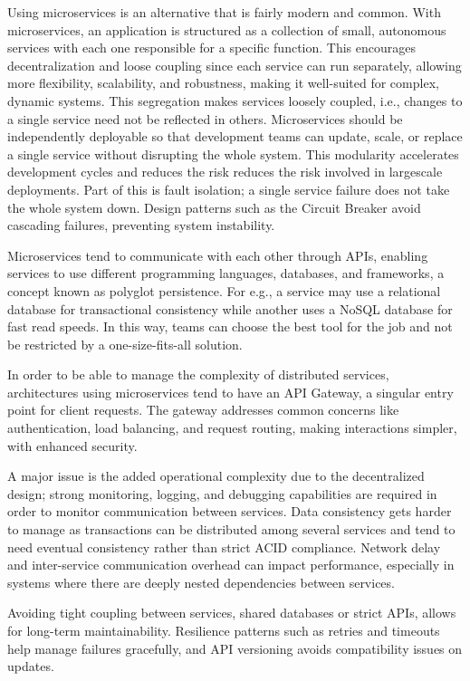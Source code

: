 \documentclass[]{final}
\begin{document}
Using microservices is an alternative that is fairly modern and common.
With microservices, an application is structured as a collection of small,
autonomous services with each one responsible for a specific function. This encourages decentralization
and loose coupling since each service can run separately, allowing more flexibility,
scalability, and robustness, making it well-suited for complex, dynamic systems.
This segregation makes services loosely coupled, i.e., changes to a single service need not be reflected in others.
Microservices should be independently deployable so that development teams can update,
scale, or replace a single service without disrupting the whole system. This
modularity accelerates development cycles and reduces the risk reduces the
risk involved in largescale deployments. Part of this is fault isolation; a
single service failure does not take the whole system down.
Design patterns such as the Circuit Breaker avoid cascading failures, preventing system instability.

Microservices tend to communicate with each other through APIs, enabling
services to use different programming languages, databases, and frameworks,
a concept known as polyglot persistence. For e.g., a service may use
a relational database for transactional consistency while another uses a NoSQL
database for fast read speeds. In this way,
teams can choose the best tool for the job and not be restricted by
a one-size-fits-all solution.

In order to be able to manage the complexity of distributed services, architectures using microservices
tend to have an API Gateway, a singular entry point for client requests. The gateway addresses
common concerns like authentication, load balancing, and request routing, making interactions simpler,
with enhanced security.

\label{microservice_issue}

A major issue is the added operational complexity due to the decentralized
design; strong monitoring, logging, and debugging capabilities are required in
order to monitor communication between services.
Data consistency gets harder to manage as transactions can be distributed among
several services and tend to need eventual consistency rather than strict ACID
compliance. Network delay and inter-service communication overhead can impact
performance, especially in systems where there are deeply nested dependencies
between services.

Avoiding tight coupling between services, shared databases or strict
APIs, allows for long-term maintainability. Resilience patterns
such as retries and timeouts help manage failures gracefully,
and API versioning avoids compatibility issues on updates.
\end{document}
